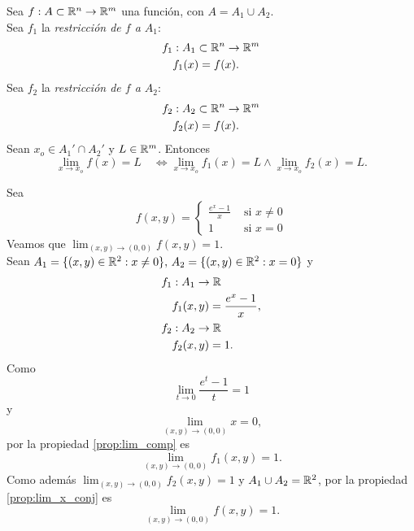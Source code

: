 \begin{propertie} \label{prop:lim_x_conj}
   Sea $f : A \subset \mathbb{R}^n \to \mathbb{R}^m$ una funci\'on, con $A = A_1 \cup A_2$.\\
   Sea $f_1$ la \emph{restricci\'on de $f$ a $A_1$}:
 \begin{align*}
  f_1 &: A_1 \subset \mathbb{R}^n \to \mathbb{R}^m \\
  &f_1(x) = f(x).
 \end{align*}
Sea $f_2$ la \emph{restricci\'on de $f$ a $A_2$}:
 \begin{align*}
  f_2 &: A_2 \subset \mathbb{R}^n \to \mathbb{R}^m \\
  &f_2(x) = f(x).
 \end{align*}
 Sean $x_o \in A_1' \cap A_2'$ y $L \in \mathbb{R}^m$. Entonces
 \[
  \lim_{x \to x_o} f(x) = L \quad \iff 
  \lim_{x \to x_o} f_1(x) = L \wedge \lim_{x \to x_o} f_2(x) = L.
 \]
\end{propertie}
\begin{example}
\mbox{}

 Sea 
  \[
   f(x,y) = 
     \begin{cases}
        \frac{e^x - 1}{x}  & \text{ si } x \ne 0  \\
         1                 & \text{ si } x = 0
     \end{cases}
  \]
 Veamos que $\lim_{(x,y) \to (0,0)} f(x,y) = 1$.\\
 Sean $A_1 = \{ (x,y) \in \mathbb{R}^2 : x \ne 0\}, \, A_2 = \{ (x,y) \in \mathbb{R}^2 : x = 0\}$ y 
 \begin{align*}
  f_1 &: A_1 \to \mathbb{R} \\
  &f_1(x,y) = \frac{e^x - 1}{x}, \\
  f_2 &: A_2 \to \mathbb{R} \\
  &f_2(x,y) = 1.
  \end{align*}
 Como 
 \[
    \lim_{t \to 0} \frac{e^t - 1}{t} = 1
 \]
 y 
 \[
    \lim_{(x,y) \to (0,0)} x = 0,
 \]
 por la propiedad \eqref{prop:lim_comp} es 
 \[
    \lim_{(x,y) \to (0,0)} f_1(x,y) = 1.
 \]
Como adem\'as $\lim_{(x,y) \to (0,0)} f_2(x,y) = 1$ y $A_1 \cup A_2 = \mathbb{R}^2$, por la propiedad \eqref{prop:lim_x_conj} es
 \[
  \lim_{(x,y) \to (0,0)} f(x,y) = 1.
 \]
\end{example}

